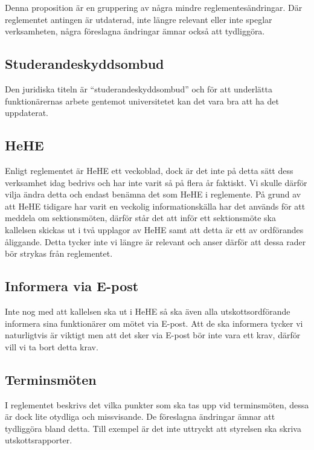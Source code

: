 \documentclass[../_main/handlingar.tex]{subfiles}
\begin{document}

Denna proposition är en gruppering av några mindre reglementesändringar. Där reglementet antingen är utdaterad, inte längre relevant eller inte speglar verksamheten, några föreslagna ändringar ämnar också att tydliggöra.

\subsection{Studerandeskyddsombud}
    
    Den juridiska titeln är “studerandeskyddsombud” och för att underlätta funktionärernas arbete gentemot universitetet kan det vara bra att ha det uppdaterat. 

\subsection{HeHE}

Enligt reglementet är HeHE ett veckoblad, dock är det inte på detta sätt dess verksamhet idag bedrivs och har inte varit så på flera år faktiskt. Vi skulle därför vilja ändra detta och endast benämna det som HeHE i reglemente. På grund av att HeHE tidigare har varit en veckolig informationskälla har det används för att meddela om sektionsmöten, därför står det att inför ett sektionsmöte ska kallelsen skickas ut i två upplagor av HeHE samt att detta är ett av ordförandes åliggande. Detta tycker inte vi längre är relevant och anser därför att dessa rader bör strykas från reglementet. 

\subsection{Informera via E-post}

Inte nog med att kallelsen ska ut i HeHE så ska även alla utskottsordförande informera sina funktionärer om mötet via E-post. Att de ska informera tycker vi naturligtvis är viktigt men att det sker via E-post bör inte vara ett krav, därför vill vi ta bort detta krav.

\subsection{Terminsmöten}

I reglementet beskrivs det vilka punkter som ska tas upp vid terminsmöten, dessa är dock lite otydliga och missvisande. De föreslagna ändringar ämnar att tydliggöra bland detta. Till exempel är det inte uttryckt att styrelsen ska skriva utskottsrapporter.  
\end{document}
